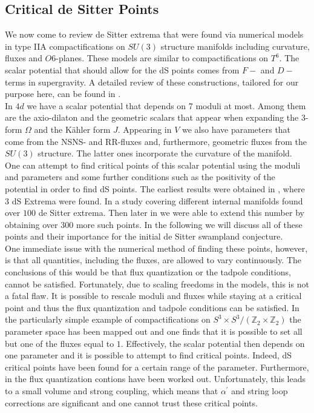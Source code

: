 \documentclass[a4paper,12pt]{report}
\begin{document}
\subsection{Critical de Sitter Points}
We now come to review de Sitter extrema that were found via numerical models in type IIA compactifications on $SU(3)$ structure manifolds including curvature, fluxes and $O6$-planes. These models are similar to compactifications on $T^ 6$. The scalar potential that should allow for the dS points comes from $F-$ and $D-$terms \cite{Grimm:2004ua,Robbins:2007yv} in supergravity. A detailed review of these constructions, tailored for our purpose here, can be found in \cite{Danielsson:2011au}.\\
In $4d$ we have a scalar potential that depends on 7 moduli at most. Among them are the axio-dilaton and the geometric scalars that appear when expanding the 3-form $\Omega$ and the Kähler form $J$. Appearing in $V$ we also have parameters that come from the NSNS- and RR-fluxes and, furthermore, geometric fluxes from the $SU(3)$ structure. The latter ones incorporate the curvature of the manifold. One can attempt to find critical points of this scalar potential using the moduli and parameters and some further conditions such as the positivity of the potential in order to find dS points. The earliest results were obtained in \cite{Caviezel:2008tf,Flauger:2008ad}, where 3 dS Extrema were found. In \cite{Danielsson:2012et} a study covering different internal manifolds found over $100$ de Sitter extrema. Then later in \cite{Roupec:2018mbn} we were able to extend this number by obtaining over $300$ more such points. In the following we will discuss all of these points and their importance for the initial de Sitter swampland conjecture.\\
One immediate issue with the numerical method of finding these points, however, is that all quantities, including the fluxes, are allowed to vary continuously. The conclusions of this would be that flux quantization or the tadpole conditions, cannot be satisfied. Fortunately, due to scaling freedoms in the models, this is not a fatal flaw. It is possible to rescale moduli and fluxes while staying at a critical point and thus the flux quantization and tadpole conditions can be satisfied. In the particularly simple example of compactifications on $S^ 3 \times S^ 3/(\mathbb{Z}_2 \times \mathbb{Z}_2)$ the parameter space has been mapped out and one finds that it is possible to set all but one of the fluxes equal to $1$. Effectively, the scalar potential then depends on one parameter and it is possible to attempt to find critical points. Indeed, dS critical points have been found \cite{Danielsson:2010bc} for a certain range of the parameter. Furthermore, in \cite{Danielsson:2011au} the flux quantization contions have been worked out. Unfortunately, this leads to a small volume and strong coupling, which means that $\alpha^ \prime$ and string loop corrections are significant and one cannot trust these critical points.\\
\end{document}
